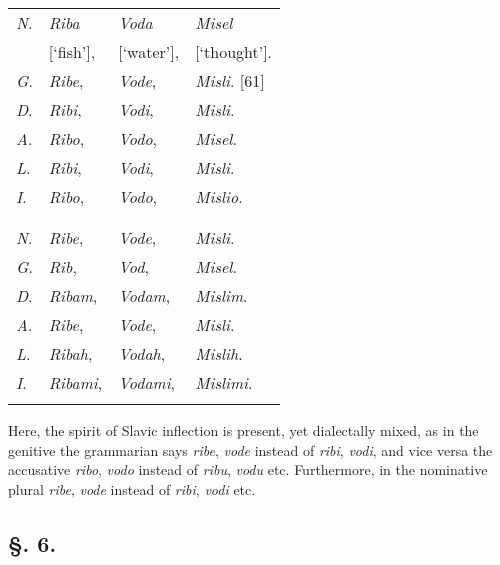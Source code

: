 \newpage

\begin{longtable}{ l l l l }
    \lsptoprule
    \multicolumn{4}{ c }{Singular.} \\
    \midrule
    \textit{N}. & \textit{Riba} & \textit{Voda} & \textit{Misel} \\
    & [‘fish’], & [‘water’], & [‘thought’]. \\
    \textit{G}. & \textit{Ribe}, & \textit{Vode}, & \textit{Misli}. [61] \\
    \textit{D}. & \textit{Ribi}, & \textit{Vodi}, & \textit{Misli}. \\ 
    \textit{A}. & \textit{Ribo}, & \textit{Vodo}, & \textit{Misel}. \\
    \textit{L}. & \textit{Ribi}, & \textit{Vodi}, & \textit{Misli}. \\
    \textit{I}. & \textit{Ribo}, & \textit{Vodo}, & \textit{Mislio}. \\
    \lspbottomrule
    \\
    \lsptoprule
    \multicolumn{4}{ c }{Plural.} \\
    \midrule
    \textit{N}. & \textit{Ribe}, & \textit{Vode}, & \textit{Misli}. \\
    \textit{G}. & \textit{Rib}, & \textit{Vod}, & \textit{Misel}. \\
    \textit{D}. & \textit{Ribam}, & \textit{Vodam}, & \textit{Mislim}. \\ 
    \textit{A}. & \textit{Ribe}, & \textit{Vode}, & \textit{Misli}. \\
    \textit{L}. & \textit{Ribah}, & \textit{Vodah}, & \textit{Mislih}. \\
    \textit{I}. & \textit{Ribami}, & \textit{Vodami}, & \textit{Mislimi}. \\
    \lspbottomrule
\end{longtable}

Here, the spirit of Slavic inflection is present, yet dialectally mixed, as in the genitive the grammarian says \textit{ribe}, \textit{vode} instead of \textit{ribi}, \textit{vodi}, and vice versa the accusative \textit{ribo}, \textit{vodo} instead of \textit{ribu}, \textit{vodu} etc. Furthermore, in the nominative plural \textit{ribe}, \textit{vode} instead of \textit{ribi}, \textit{vodi} etc.

\subsection*{\hspace*{\fill}§. 6.\hspace*{\fill}}

